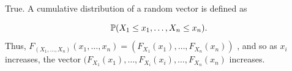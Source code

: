 
True. A cumulative distribution of a random vector is defined as 

\[
    \P(X_{1} \leq x_1, \dots, X_{n} \leq x_{n} ) 
.\] 
Thus, $ F_{(X_1, \dots, X_{n} )}(x_1,\dots,x_{n})  = (F_{X_1 }(x_{1}), \dots ,F_{X_{n} }(x_{n} )   )$
, and so as $ x_{i} $ increases, the vector $ (F_{X_{1} }(x_{1}), \dots, F_{X_{i} } (x_{i} ), \dots,
F_{X_{n} } (x_{n}  )$ increases.
